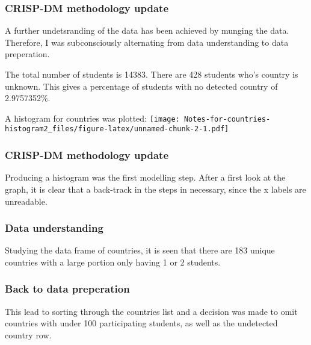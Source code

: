 \documentclass[]{article}
\newenvironment{Shaded}{\begin{snugshade}}{\end{snugshade}}
\newcommand{\KeywordTok}[1]{\textcolor[rgb]{0.13,0.29,0.53}{\textbf{#1}}}
\newcommand{\DecValTok}[1]{\textcolor[rgb]{0.00,0.00,0.81}{#1}}
\newcommand{\StringTok}[1]{\textcolor[rgb]{0.31,0.60,0.02}{#1}}
\newcommand{\CommentTok}[1]{\textcolor[rgb]{0.56,0.35,0.01}{\textit{#1}}}
\newcommand{\OperatorTok}[1]{\textcolor[rgb]{0.81,0.36,0.00}{\textbf{#1}}}
\newcommand{\NormalTok}[1]{#1}
\begin{document}
\subsubsection{CRISP-DM methodology
update}\label{crisp-dm-methodology-update}

A further undetsranding of the data has been achieved by munging the
data. Therefore, I was subconsciously alternating from data
understanding to data preperation.

The total number of students is 14383. There are 428 students who's
country is unknown. This gives a percentage of students with no detected
country of 2.9757352\%.

A histogram for countries was plotted:
\texttt{[image: Notes-for-countries-histogram2\_files/figure-latex/unnamed-chunk-2-1.pdf]}

\subsubsection{CRISP-DM methodology
update}\label{crisp-dm-methodology-update-1}

Producing a histogram was the first modelling step. After a first look
at the graph, it is clear that a back-track in the steps in necessary,
since the x labels are unreadable.

\subsubsection{Data understanding}\label{data-understanding-1}

Studying the data frame of countries, it is seen that there are 183
unique countries with a large portion only having 1 or 2 students.

\subsubsection{Back to data preperation}\label{back-to-data-preperation}

This lead to sorting through the countries list and a decision was made
to omit countries with under 100 participating students, as well as the
undetected country row.

\begin{Shaded}
\end{Shaded}
\end{document}
